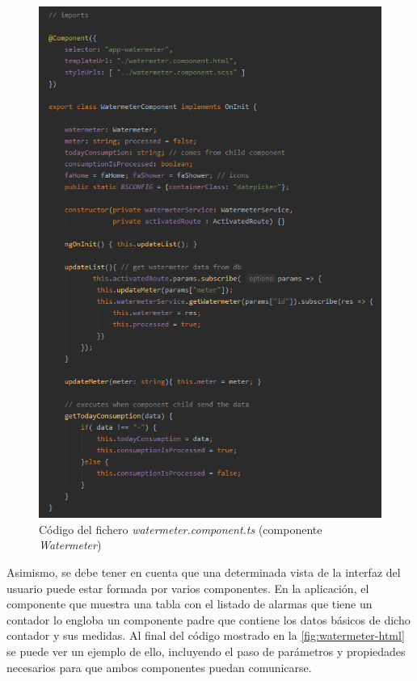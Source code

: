 \documentclass[pdftex,11pt,a4paper]{book}
\begin{document}
 \begin{figure}[h]
 \centering
 \includegraphics [scale=0.72] {images/implementacion/watermeter-ts.png}
 \caption{Código del fichero \textit{watermeter.component.ts} (componente \textit{Watermeter})} \label{fig:watermeter-ts}
 \end{figure}

Asimismo, se debe tener en cuenta que una determinada vista de la interfaz del usuario puede estar formada por varios componentes. En la aplicación, el componente que muestra una tabla con el listado de alarmas que tiene un contador lo engloba un componente padre que contiene los datos básicos de dicho contador y sus medidas. Al final del código mostrado en la \ref{fig:watermeter-html} se puede ver un ejemplo de ello, incluyendo el paso de parámetros y propiedades necesarios para que ambos componentes puedan comunicarse. 
\end{document}
